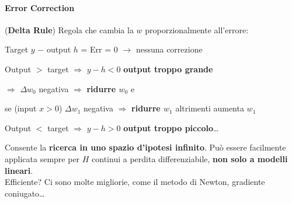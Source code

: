 \documentclass[10pt]{book}
\begin{document}
\paragraph{Error Correction} (\textbf{Delta Rule}) Regola che cambia la $w$ proporzionalmente all'errore:
\begin{list}{}{}
	\item Target $y$ $-$ output $h$ = Err = 0 $\rightarrow$ nessuna correzione
	\item Output $>$ target $\Rightarrow$ $y-h<0$ \textbf{output troppo grande}
	\begin{list}{}{}
		\item $\Rightarrow$ $\Delta w_0$ negativa $\Rightarrow$ \textbf{ridurre $w_0$} e
		\item se (input $x > 0$) $\Delta w_1$ negativa $\Rightarrow$ \textbf{ridurre $w_1$} altrimenti aumenta $w_1$
	\end{list}
	\item Output $<$ target $\Rightarrow$ $y-h>0$ \textbf{output troppo piccolo}\ldots
\end{list}
Consente la \textbf{ricerca in uno spazio d'ipotesi infinito}. Può essere facilmente applicata sempre per $H$ continui a perdita differenziabile, \textbf{non solo a modelli lineari}.\\
Efficiente? Ci sono molte migliorie, come il metodo di Newton, gradiente coniugato\ldots
\end{document}
